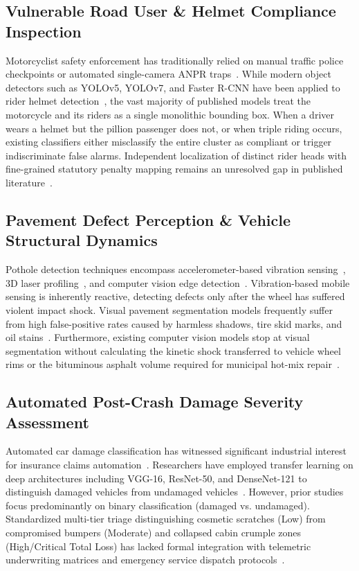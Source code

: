 \documentclass[journal,compsoc]{IEEEtran}
\begin{document}
\subsection{Vulnerable Road User \& Helmet Compliance Inspection}
Motorcyclist safety enforcement has traditionally relied on manual traffic police checkpoints or automated single-camera ANPR traps~\cite{silva2022deep}. While modern object detectors such as YOLOv5, YOLOv7, and Faster R-CNN have been applied to rider helmet detection~\cite{redmon2018yolov3, jocher2023yolo}, the vast majority of published models treat the motorcycle and its riders as a single monolithic bounding box. When a driver wears a helmet but the pillion passenger does not, or when triple riding occurs, existing classifiers either misclassify the entire cluster as compliant or trigger indiscriminate false alarms. Independent localization of distinct rider heads with fine-grained statutory penalty mapping remains an unresolved gap in published literature~\cite{singh2021automated}.

\subsection{Pavement Defect Perception \& Vehicle Structural Dynamics}
Pothole detection techniques encompass accelerometer-based vibration sensing~\cite{eriksson2008pothole}, 3D laser profiling~\cite{hou2020state}, and computer vision edge detection~\cite{buza2019pothole}. Vibration-based mobile sensing is inherently reactive, detecting defects only after the wheel has suffered violent impact shock. Visual pavement segmentation models frequently suffer from high false-positive rates caused by harmless shadows, tire skid marks, and oil stains~\cite{fan2020pothole}. Furthermore, existing computer vision models stop at visual segmentation without calculating the kinetic shock transferred to vehicle wheel rims or the bituminous asphalt volume required for municipal hot-mix repair~\cite{irc2015pothole}.

\subsection{Automated Post-Crash Damage Severity Assessment}
Automated car damage classification has witnessed significant industrial interest for insurance claims automation~\cite{dwarampudi2021automated, singh2022deep}. Researchers have employed transfer learning on deep architectures including VGG-16, ResNet-50, and DenseNet-121 to distinguish damaged vehicles from undamaged vehicles~\cite{simonyan2014very}. However, prior studies focus predominantly on binary classification (damaged vs. undamaged). Standardized multi-tier triage distinguishing cosmetic scratches (Low) from compromised bumpers (Moderate) and collapsed cabin crumple zones (High/Critical Total Loss) has lacked formal integration with telemetric underwriting matrices and emergency service dispatch protocols~\cite{irdai2022motor}.
\end{document}
